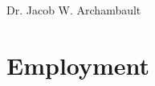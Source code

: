 \documentclass{prometheus_cv}
\begin{document}
	\thispagestyle{empty}					%
	\pagestyle{fancy}			 		%
	
	\vspace*{-1cm}
	\centering 
	\vspace*{-0.10em}
	\begin{Large} 
		Dr. Jacob W. Archambault
	\end{Large}
	
	\vspace*{0.25em}
	\begin{scshape}
		\begin{footnotesize}
			
		\end{footnotesize}
	\end{scshape}
	\vspace*{0.4cm}

	


\section{Employment}

%

%
%



%
\end{document}
